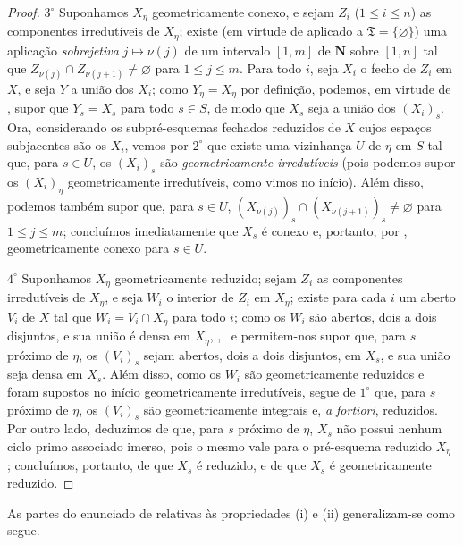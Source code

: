 \begin{proof}
$3^\circ$ Suponhamos $X_\eta$ geometricamente conexo, e sejam $Z_i$ ($1\leqslant i\leqslant n$) as componentes irredutíveis de $X_\eta$; existe (em virtude de  aplicado a $\mathfrak{T}=\{\varnothing\}$) uma aplicação \emph{sobrejetiva} $j\mapsto\nu(j)$ de um intervalo $[1,m]$ de $\mathbf{N}$ sobre $[1,n]$ tal que $Z_{\nu(j)}\cap Z_{\nu(j+1)}\neq\varnothing$ para $1\leqslant j\leqslant m$.
Para todo $i$, seja $X_i$ o fecho de $Z_i$ em $X$, e seja $Y$ a união dos $X_i$; como $Y_\eta=X_\eta$ por definição, podemos, em virtude de , supor que $Y_s=X_s$ para todo $s\in S$, de modo que $X_s$ seja a união dos $(X_i)_s$.
Ora, considerando os subpré-esquemas fechados reduzidos de $X$ cujos espaços subjacentes são os $X_i$, vemos por $2^\circ$ que existe uma vizinhança $U$ de $\eta$ em $S$ tal que, para $s\in U$, os $(X_i)_s$ são \emph{geometricamente irredutíveis} (pois podemos supor os $(X_i)_\eta$ geometricamente irredutíveis, como vimos no início).
Além disso, podemos também supor que, para $s\in U$, $(X_{\nu(j)})_s\cap(X_{\nu(j+1)})_s\neq\varnothing$  para $1\leqslant j\leqslant m$; concluímos imediatamente que $X_s$ é conexo e, portanto, por , geometricamente conexo para $s\in U$.

$4^\circ$ Suponhamos $X_\eta$ geometricamente reduzido; sejam $Z_i$ as componentes irredutíveis de $X_\eta$, e seja $W_i$ o interior de $Z_i$ em $X_\eta$; existe para cada $i$ um aberto $V_i$ de $X$ tal que $W_i=V_i\cap X_\eta$ para todo $i$; como os $W_i$ são abertos, dois a dois disjuntos, e sua união é densa em $X_\eta$, ,~ e  permitem-nos supor que, para $s$ próximo de $\eta$, os $(V_i)_s$ sejam abertos, dois a dois disjuntos, em $X_s$, e sua união seja densa em $X_s$.
Além disso, como os $W_i$ são geometricamente reduzidos e foram supostos no início geometricamente irredutíveis, segue de $1^\circ$ que, para $s$ próximo de $\eta$, os $(V_i)_s$ são geometricamente integrais e, \emph{a fortiori}, reduzidos.
Por outro lado, deduzimos de  que, para $s$ próximo de $\eta$, $X_s$ não possui nenhum ciclo primo associado imerso, pois o mesmo vale para o pré-esquema reduzido $X_\eta$ ; concluímos, portanto, de  que $X_s$ é reduzido, e de  que $X_s$ é geometricamente reduzido.
\end{proof}


As partes do enunciado de  relativas às propriedades (i) e (ii) generalizam-se como segue.

